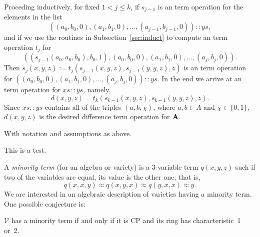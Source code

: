 Proceding inductively, for fixed $1<j\leq k$, 
if $s_{j-1}$ is an \ld term operation 
for the elements in the list
\begin{equation*}
((a_0, b_0, 0), (a_1, b_1, 0), \dots, (a_{j-1}, b_{j-1}, 0)) :: ys,
\end{equation*}
and if we use the routines in Subsection~\ref{sec:induct} 
to compute an \ld term operation $t_j$ for
\begin{equation*}
((s_{j-1}(a_0, a_0, b_0), b_0, 1), (a_0, b_0, 0),(a_1, b_1, 0),\dots, 
(a_j, b_j, 0)). 
\end{equation*}
Then $s_j(x,y,z) := t_j(s_{j-1}(x,y,z), s_{j-1}(y,y,z), z)$ is an \ld term 
operation for 
$((a_0, b_0, 0), (a_1, b_1, 0), \dots, (a_j, b_j, 0)) :: ys$.
In the end we arrive at an \ld term operation for $xs :: ys$, namely,
\begin{equation*}
d(x,y,z) = t_k(s_{k-1}(x,y,z), s_{k-1}(y,y,z), z).
\end{equation*}
Since $xs :: ys$ contains all of the triples $(a,b,\chi)$, where
$a, b \in A$ and $\chi \in \{0,1\}$, 
$d(x,y,z)$ is the desired difference term operation for $\mathbf{A}$.




























With notation and assumptions as above.

\begin{theorem}
This is a test.
\end{theorem}







%




A \emph{minority term} (for an algebra or variety) is a 
3-variable term $q(x,y,z)$ such if two of the variables
are equal, its value is the other one; that is, 
\[
q(x,x,y) \approx q(x,y,x) \approx q(y,x,x) \approx y.
\]
We are interested in an algebraic description of varieties having
a minority term. One possible conjecture is:
\begin{conjecture}
$\mathcal V$ has a minority term if and only if it is CP and its
ring has characteristic~1 or~2.
\end{conjecture}



